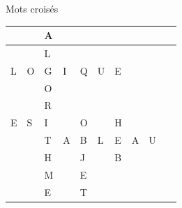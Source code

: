 \begin{Exercice}{Mots croisés}
			\begin{center}
			\begin{minipage}{5.749cm}
			\begin{center}
			\tablehead{}
			\begin{supertabular}{|m{0.37cm}|m{0.37cm}|m{0.37cm}|m{0.37cm}|m{0.37cm}|m{0.37cm}|m{0.37cm}|m{0.37cm}|m{0.37cm}|m{0.41900003cm}|}
			\hline
			~
			 &
			~
			 &
			\centering  A &
			~
			 &
			~
			 &
			~
			 &
			~
			 &
			~
			 &
			~
			 &
			~
			\\\hline
			~
			 &
			~
			 &
			\centering  L &
			~
			 &
			~
			 &
			~
			 &
			~
			 &
			~
			 &
			~
			 &
			~
			\\\hline
			\centering  L &
			\centering  O &
			\centering  G &
			\centering  I &
			\centering  Q &
			\centering  U &
			\centering  E &
			~
			 &
			~
			 &
			~
			\\\hline
			~
			 &
			~
			 &
			\centering  O &
			~
			 &
			~
			 &
			~
			 &
			~
			 &
			~
			 &
			~
			 &
			~
			\\\hline
			~
			 &
			~
			 &
			\centering  R &
			~
			 &
			~
			 &
			~
			 &
			~
			 &
			~
			 &
			~
			 &
			~
			\\\hline
			\centering  E &
			\centering  S &
			\centering  I &
			~
			 &
			\centering  O &
			~
			 &
			\centering  H &
			~
			 &
			~
			 &
			~
			\\\hline
			~
			 &
			~
			 &
			\centering  T &
			\centering  A &
			\centering  B &
			\centering  L &
			\centering  E &
			\centering  A &
			\centering  U &
			~
			\\\hline
			~
			 &
			~
			 &
			\centering  H &
			~
			 &
			\centering  J &
			~
			 &
			\centering  B &
			~
			 &
			~
			 &
			~
			\\\hline
			~
			 &
			~
			 &
			\centering  M &
			~
			 &
			\centering  E &
			~
			 &
			~
			 &
			~
			 &
			~
			 &
			~
			\\\hline
			~
			 &
			~
			 &
			\centering  E &
			~
			 &
			\centering  T &
			~
			 &
			~
			 &
			~
			 &
			~
			 &
			~
			\\\hline
			\end{supertabular}
			\end{center}
			\end{minipage}
			\end{center}

\end{Exercice}

